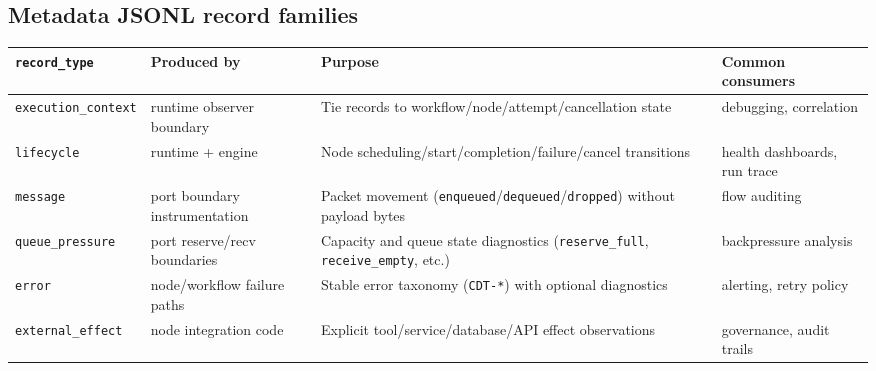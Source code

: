 \documentclass[
  letterpaper,
]{report}
\begin{document}
\subsection{Metadata JSONL record
families}\label{metadata-jsonl-record-families}

\begin{longtable}[]{@{}
  >{\raggedright\arraybackslash}p{}
  >{\raggedright\arraybackslash}p{}
  >{\raggedright\arraybackslash}p{}
  >{\raggedright\arraybackslash}p{}@{}}
\toprule\noalign{}
\begin{minipage}[b]{\linewidth}\raggedright
\texttt{record\_type}
\end{minipage} & \begin{minipage}[b]{\linewidth}\raggedright
Produced by
\end{minipage} & \begin{minipage}[b]{\linewidth}\raggedright
Purpose
\end{minipage} & \begin{minipage}[b]{\linewidth}\raggedright
Common consumers
\end{minipage} \\
\midrule\noalign{}
\endhead
\bottomrule\noalign{}
\endlastfoot
\texttt{execution\_context} & runtime observer boundary & Tie records to
workflow/node/attempt/cancellation state & debugging, correlation \\
\texttt{lifecycle} & runtime + engine & Node
scheduling/start/completion/failure/cancel transitions & health
dashboards, run trace \\
\texttt{message} & port boundary instrumentation & Packet movement
(\texttt{enqueued}/\texttt{dequeued}/\texttt{dropped}) without payload
bytes & flow auditing \\
\texttt{queue\_pressure} & port reserve/recv boundaries & Capacity and
queue state diagnostics (\texttt{reserve\_full},
\texttt{receive\_empty}, etc.) & backpressure analysis \\
\texttt{error} & node/workflow failure paths & Stable error taxonomy
(\texttt{CDT-*}) with optional diagnostics & alerting, retry policy \\
\texttt{external\_effect} & node integration code & Explicit
tool/service/database/API effect observations & governance, audit
trails \\
\end{longtable}
\end{document}
